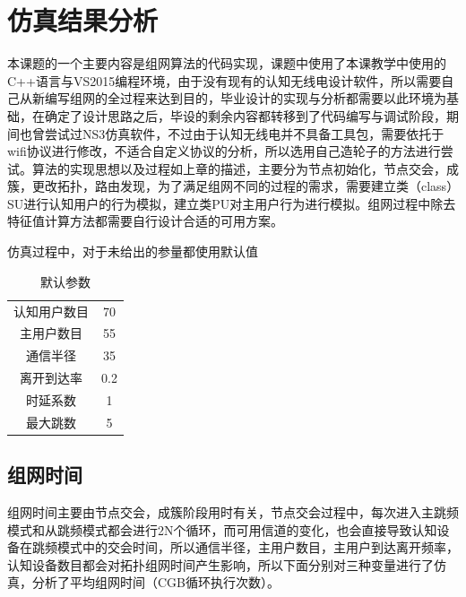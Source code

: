 \documentclass[a4paper,AutoFakeBold,oneside,12pt]{book}
\begin{document}
\chapter{仿真结果分析}
  本课题的一个主要内容是组网算法的代码实现，课题中使用了本课教学中使用的C++语言与VS2015编程环境，由于没有现有的认知无线电设计软件，所以需要自己从新编写组网的全过程来达到目的，毕业设计的实现与分析都需要以此环境为基础，在确定了设计思路之后，毕设的剩余内容都转移到了代码编写与调试阶段，期间也曾尝试过NS3仿真软件，不过由于认知无线电并不具备工具包，需要依托于wifi协议进行修改，不适合自定义协议的分析，所以选用自己造轮子的方法进行尝试。算法的实现思想以及过程如上章的描述，主要分为节点初始化，节点交会，成簇，更改拓扑，路由发现，为了满足组网不同的过程的需求，需要建立类（class）SU进行认知用户的行为模拟，建立类PU对主用户行为进行模拟。组网过程中除去特征值计算方法都需要自行设计合适的可用方案。
  
  仿真过程中，对于未给出的参量都使用默认值
  \begin{table}[h]
  \setlength{\belowcaptionskip}{7pt}
  \centering
  \caption{默认参数}
 
  \begin{tabular}{cc} 
  认知用户数目&70\\
  主用户数目&55\\
  通信半径&35\\
  离开到达率&0.2\\
  时延系数&1\\
  最大跳数&5
  \end{tabular}
  \end{table}
  \section{组网时间}
   组网时间主要由节点交会，成簇阶段用时有关，节点交会过程中，每次进入主跳频模式和从跳频模式都会进行2N个循环，而可用信道的变化，也会直接导致认知设备在跳频模式中的交会时间，所以通信半径，主用户数目，主用户到达离开频率，认知设备数目都会对拓扑组网时间产生影响，所以下面分别对三种变量进行了仿真，分析了平均组网时间（CGB循环执行次数）。
\end{document}

